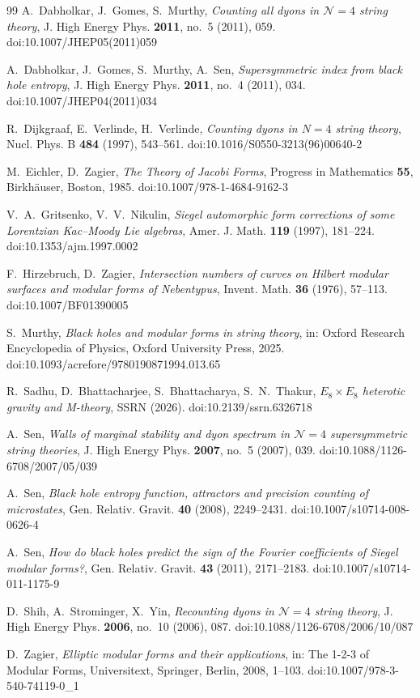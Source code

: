 \documentclass[11pt]{amsart}
\theoremstyle{definition}
\begin{document}
\begin{thebibliography}{99}
 A.~Dabholkar, J.~Gomes, S.~Murthy, \emph{Counting all dyons in $\mathcal N=4$ string theory}, J. High Energy Phys. \textbf{2011}, no.~5 (2011), 059. doi:10.1007/JHEP05(2011)059

 A.~Dabholkar, J.~Gomes, S.~Murthy, A.~Sen, \emph{Supersymmetric index from black hole entropy}, J. High Energy Phys. \textbf{2011}, no.~4 (2011), 034. doi:10.1007/JHEP04(2011)034

 R.~Dijkgraaf, E.~Verlinde, H.~Verlinde, \emph{Counting dyons in $N=4$ string theory}, Nucl. Phys. B \textbf{484} (1997), 543--561. doi:10.1016/S0550-3213(96)00640-2

 M.~Eichler, D.~Zagier, \emph{The Theory of Jacobi Forms}, Progress in Mathematics \textbf{55}, Birkh\"auser, Boston, 1985. doi:10.1007/978-1-4684-9162-3

 V.~A.~Gritsenko, V.~V.~Nikulin, \emph{Siegel automorphic form corrections of some Lorentzian Kac--Moody Lie algebras}, Amer. J. Math. \textbf{119} (1997), 181--224. doi:10.1353/ajm.1997.0002

 F.~Hirzebruch, D.~Zagier, \emph{Intersection numbers of curves on Hilbert modular surfaces and modular forms of Nebentypus}, Invent. Math. \textbf{36} (1976), 57--113. doi:10.1007/BF01390005

 S.~Murthy, \emph{Black holes and modular forms in string theory}, in: Oxford Research Encyclopedia of Physics, Oxford University Press, 2025. doi:10.1093/acrefore/9780190871994.013.65

 R.~Sadhu, D.~Bhattacharjee, S.~Bhattacharya, S.~N.~Thakur, \emph{$E_8\times E_8$ heterotic gravity and M-theory}, SSRN (2026). doi:10.2139/ssrn.6326718

 A.~Sen, \emph{Walls of marginal stability and dyon spectrum in $\mathcal N=4$ supersymmetric string theories}, J. High Energy Phys. \textbf{2007}, no.~5 (2007), 039. doi:10.1088/1126-6708/2007/05/039

 A.~Sen, \emph{Black hole entropy function, attractors and precision counting of microstates}, Gen. Relativ. Gravit. \textbf{40} (2008), 2249--2431. doi:10.1007/s10714-008-0626-4

 A.~Sen, \emph{How do black holes predict the sign of the Fourier coefficients of Siegel modular forms?}, Gen. Relativ. Gravit. \textbf{43} (2011), 2171--2183. doi:10.1007/s10714-011-1175-9

 D.~Shih, A.~Strominger, X.~Yin, \emph{Recounting dyons in $\mathcal N=4$ string theory}, J. High Energy Phys. \textbf{2006}, no.~10 (2006), 087. doi:10.1088/1126-6708/2006/10/087

 D.~Zagier, \emph{Elliptic modular forms and their applications}, in: The 1-2-3 of Modular Forms, Universitext, Springer, Berlin, 2008, 1--103. doi:10.1007/978-3-540-74119-0\_1

\end{thebibliography}
\end{document}
